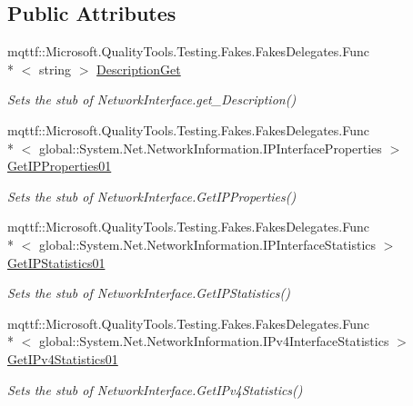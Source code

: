 \subsection*{Public Attributes}
\begin{DoxyCompactItemize}
\item 
mqttf\-::\-Microsoft.\-Quality\-Tools.\-Testing.\-Fakes.\-Fakes\-Delegates.\-Func\\*
$<$ string $>$ \hyperlink{class_system_1_1_net_1_1_network_information_1_1_fakes_1_1_stub_network_interface_a6768efec2873025c10d6b30a236b4deb}{Description\-Get}
\begin{DoxyCompactList}\small\item\em Sets the stub of Network\-Interface.\-get\-\_\-\-Description()\end{DoxyCompactList}\item 
mqttf\-::\-Microsoft.\-Quality\-Tools.\-Testing.\-Fakes.\-Fakes\-Delegates.\-Func\\*
$<$ global\-::\-System.\-Net.\-Network\-Information.\-I\-P\-Interface\-Properties $>$ \hyperlink{class_system_1_1_net_1_1_network_information_1_1_fakes_1_1_stub_network_interface_a3d5ddeb5695be5b61e4518ef6e401d0d}{Get\-I\-P\-Properties01}
\begin{DoxyCompactList}\small\item\em Sets the stub of Network\-Interface.\-Get\-I\-P\-Properties()\end{DoxyCompactList}\item 
mqttf\-::\-Microsoft.\-Quality\-Tools.\-Testing.\-Fakes.\-Fakes\-Delegates.\-Func\\*
$<$ global\-::\-System.\-Net.\-Network\-Information.\-I\-P\-Interface\-Statistics $>$ \hyperlink{class_system_1_1_net_1_1_network_information_1_1_fakes_1_1_stub_network_interface_a5f9af28356d254f4d11215dcb71d48b5}{Get\-I\-P\-Statistics01}
\begin{DoxyCompactList}\small\item\em Sets the stub of Network\-Interface.\-Get\-I\-P\-Statistics()\end{DoxyCompactList}\item 
mqttf\-::\-Microsoft.\-Quality\-Tools.\-Testing.\-Fakes.\-Fakes\-Delegates.\-Func\\*
$<$ global\-::\-System.\-Net.\-Network\-Information.\-I\-Pv4\-Interface\-Statistics $>$ \hyperlink{class_system_1_1_net_1_1_network_information_1_1_fakes_1_1_stub_network_interface_a692726c4e07ccec7d6c4255a8ddce1e8}{Get\-I\-Pv4\-Statistics01}
\begin{DoxyCompactList}\small\item\em Sets the stub of Network\-Interface.\-Get\-I\-Pv4\-Statistics()\end{DoxyCompactList}\item 

\end{DoxyCompactItemize}
